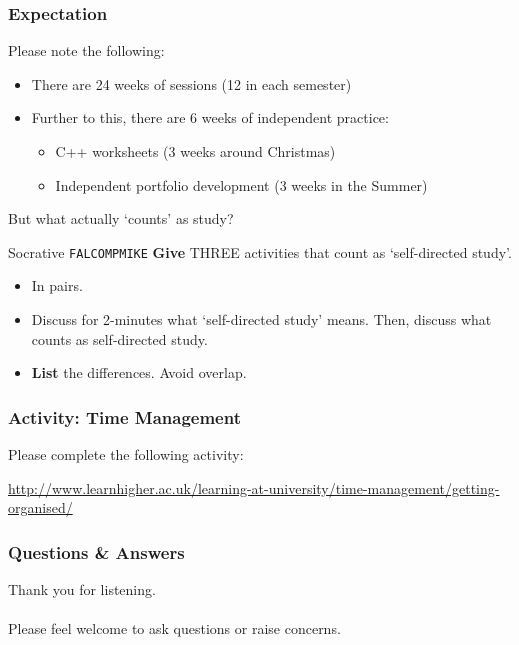 \begin{frame}
	\frametitle{Expectation}
	
	Please note the following:
	
	\begin{itemize}
		\item There are 24 weeks of sessions (12 in each semester)
		\item Further to this, there are 6 weeks of independent practice:
		\begin{itemize}
			\item C++ worksheets (3 weeks around Christmas) 
			\item Independent portfolio development (3 weeks in the Summer)
		\end{itemize}
	\end{itemize}
	
	But what actually `counts' as study?

\end{frame}



\begin{frame}{Socrative \texttt{FALCOMPMIKE}}
	\textbf{Give} THREE activities that count as `self-directed study'.
	
	\begin{itemize}
		\item In pairs.
		\item Discuss for 2-minutes what `self-directed study' means. Then, discuss what counts as self-directed study.
		\item \textbf{List} the differences. Avoid overlap.
	\end{itemize}
\end{frame}


\begin{frame}
	\frametitle{Activity: Time Management}
	
	Please complete the following activity:
	
	\vspace{2em}
	
	\url{http://www.learnhigher.ac.uk/learning-at-university/time-management/getting-organised/}

\end{frame}



\begin{frame}
	\frametitle{Questions \& Answers}	
	\begin{center}
		Thank you for listening. 
		\\~\\
		Please feel welcome to ask questions or raise concerns.
	\end{center}
\end{frame}


